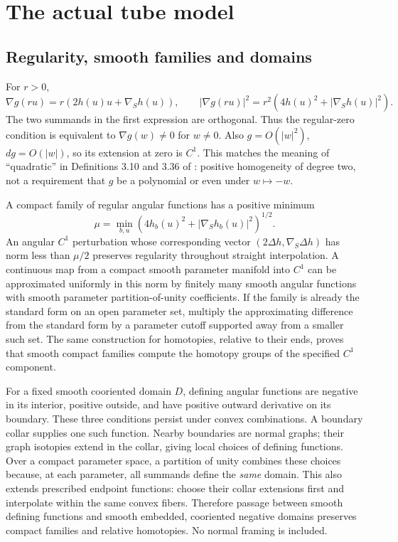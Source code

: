 \documentclass[11pt]{article}
\theoremstyle{remark}
\begin{document}
\section{The actual tube model}\label{sec:model}

\subsection{Regularity, smooth families and domains}
For \(r>0\),
\begin{equation}\label{eq:angular}
 \nabla g(ru)=r(2h(u)u+\nabla_Sh(u)),\qquad
 |\nabla g(ru)|^2=r^2(4h(u)^2+|\nabla_Sh(u)|^2).
\end{equation}
The two summands in the first expression are orthogonal. Thus the
regular-zero condition is equivalent to \(\nabla g(w)\ne0\) for \(w\ne0\).
Also \(g=O(|w|^2)\), \(dg=O(|w|)\), so its extension at zero is \(C^1\).
This matches the meaning of ``quadratic'' in Definitions 3.10 and 3.36
of \cite{AAGCK}: positive homogeneity of degree two, not a requirement
that \(g\) be a polynomial or even under \(w\mapsto-w\).

A compact family of regular angular functions has a positive minimum
\[
 \mu=\min_{b,u}(4h_b(u)^2+|\nabla_Sh_b(u)|^2)^{1/2}.
\]
An angular \(C^1\) perturbation whose corresponding vector
\((2\Delta h,\nabla_S\Delta h)\) has norm less than \(\mu/2\)
preserves regularity throughout straight interpolation. A continuous
map from a compact smooth parameter manifold into \(C^1\) can be
approximated uniformly in this norm by finitely many smooth angular
functions with smooth parameter partition-of-unity coefficients.
If the family is already the standard form on an open parameter set,
multiply the approximating difference from the standard form by a
parameter cutoff supported away from a smaller such set.
The same construction for homotopies, relative to their ends, proves
that smooth compact families compute the homotopy groups of the
specified \(C^1\) component.

For a fixed smooth cooriented domain \(D\), defining angular functions
are negative in its interior, positive outside, and have positive
outward derivative on its boundary. These three conditions persist
under convex combinations. A boundary collar supplies one such
function. Nearby boundaries are normal graphs; their graph isotopies
extend in the collar, giving local choices of defining functions.
Over a compact parameter space, a partition of unity combines these
choices because, at each parameter, all summands define the
\emph{same} domain. This also extends prescribed endpoint functions:
choose their collar extensions first and interpolate within the same
convex fibers. Therefore passage between smooth defining functions
and smooth embedded, cooriented negative domains preserves compact
families and relative homotopies. No normal framing is included.
\end{document}
